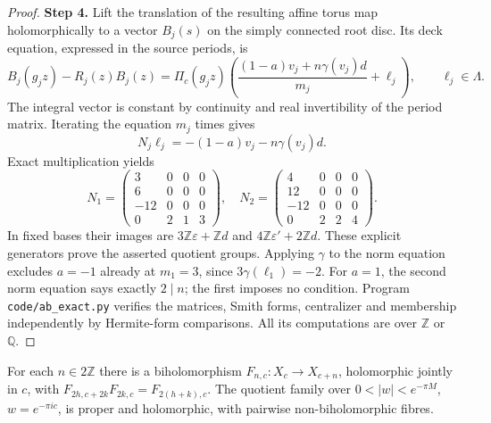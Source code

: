 \begin{proof}
\par\smallskip\noindent\textbf{Step 4.} Lift the translation of the resulting affine torus map holomorphically to a vector $B_j(s)$ on the simply connected root disc. Its deck equation, expressed in the source periods, is
\[
 B_j(g_jz)-R_j(z)B_j(z)=\Pi_c(g_jz)
 \left(\frac{(1-a)v_j+n\gamma(v_j)d}{m_j}+\ell_j\right),\qquad\ell_j\in\Lambda.
\]
The integral vector is constant by continuity and real invertibility of the period matrix. Iterating the equation $m_j$ times gives
\[
 N_j\ell_j=-(1-a)v_j-n\gamma(v_j)d.
\]
Exact multiplication yields
\[
 N_1=\begin{pmatrix}3&0&0&0\\6&0&0&0\\-12&0&0&0\\0&2&1&3\end{pmatrix},\quad
 N_2=\begin{pmatrix}4&0&0&0\\12&0&0&0\\-12&0&0&0\\0&2&2&4\end{pmatrix}.
\]
In fixed bases their images are $3\mathbb Z\varepsilon+\mathbb Zd$ and $4\mathbb Z\varepsilon'+2\mathbb Zd$. These explicit generators prove the asserted quotient groups. Applying $\gamma$ to the norm equation excludes $a=-1$ already at $m_1=3$, since $3\gamma(\ell_1)=-2$. For $a=1$, the second norm equation says exactly $2\mid n$; the first imposes no condition. Program \texttt{code/ab\_exact.py} verifies the matrices, Smith forms, centralizer and membership independently by Hermite-form comparisons. All its computations are over $\mathbb Z$ or $\mathbb Q$.
\end{proof}
\begin{cited}[FAM A.3.1; K]\label{fam:A.3.1}
For each $n\in2\mathbb Z$ there is a biholomorphism $F_{n,c}:X_c\to X_{c+n}$, holomorphic jointly in $c$, with $F_{2h,c+2k}F_{2k,c}=F_{2(h+k),c}$. The quotient family over $0<|w|<e^{-\pi M}$, $w=e^{-\pi ic}$, is proper and holomorphic, with pairwise non-biholomorphic fibres.
\end{cited}
